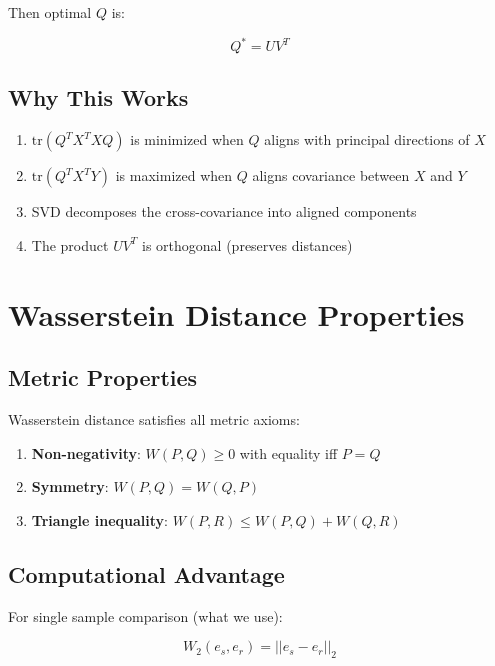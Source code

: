 \documentclass[12pt,a4paper,oneside]{report}
\begin{document}
Then optimal $Q$ is:

\begin{equation}
Q^* = U V^T
\end{equation}

\subsection{Why This Works}

\begin{enumerate}
    \item $\text{tr}(Q^T X^T X Q)$ is minimized when $Q$ aligns with principal directions of $X$
    \item $\text{tr}(Q^T X^T Y)$ is maximized when $Q$ aligns covariance between $X$ and $Y$
    \item SVD decomposes the cross-covariance into aligned components
    \item The product $UV^T$ is orthogonal (preserves distances)
\end{enumerate}

\section{Wasserstein Distance Properties}

\subsection{Metric Properties}

Wasserstein distance satisfies all metric axioms:

\begin{enumerate}
    \item \textbf{Non-negativity}: $W(P, Q) \geq 0$ with equality iff $P = Q$

    \item \textbf{Symmetry}: $W(P, Q) = W(Q, P)$

    \item \textbf{Triangle inequality}: $W(P, R) \leq W(P, Q) + W(Q, R)$
\end{enumerate}

\subsection{Computational Advantage}

For single sample comparison (what we use):

\begin{equation}
W_2(e_s, e_r) = ||e_s - e_r||_2
\end{equation}
\end{document}
